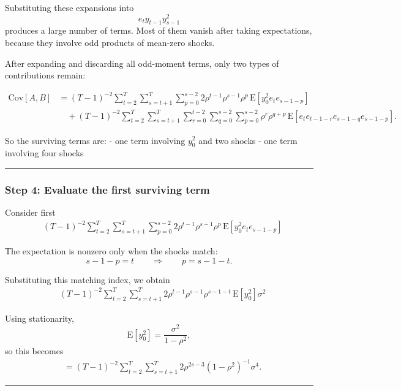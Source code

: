 \documentclass[11pt]{article}
\begin{document}
Substituting these expansions into \[
e_t y_{t-1} y_{s-1}^2
\] produces a large number of terms. Most of them vanish after taking
expectations, because they involve odd products of mean-zero shocks.

After expanding and discarding all odd-moment terms, only two types of
contributions remain:

\[
\begin{aligned}
\text{Cov}[A,B]
&=
(T-1)^{-2}\sum_{t=2}^{T}\sum_{s=t+1}^{T}\sum_{p=0}^{s-2}
2\rho^{t-1}\rho^{s-1}\rho^p\,\text{E}[y_0^2 e_t e_{s-1-p}]\\
&\quad+
(T-1)^{-2}\sum_{t=2}^{T}\sum_{s=t+1}^{T}\sum_{r=0}^{t-2}\sum_{q=0}^{s-2}\sum_{p=0}^{s-2}
\rho^r\rho^{q+p}\,\text{E}[e_t e_{t-1-r}e_{s-1-q}e_{s-1-p}].
\end{aligned}
\]

So the surviving terms are: - one term involving \(y_0^2\) and two
shocks - one term involving four shocks

\begin{center}\rule{0.5\linewidth}{0.5pt}\end{center}

\subsubsection{Step 4: Evaluate the first surviving
term}\label{step-4-evaluate-the-first-surviving-term}

Consider first \[
\begin{aligned}
&(T-1)^{-2}\sum_{t=2}^{T}\sum_{s=t+1}^{T}\sum_{p=0}^{s-2}
2\rho^{t-1}\rho^{s-1}\rho^p\,\text{E}[y_0^2 e_t e_{s-1-p}]
\end{aligned}
\]

The expectation is nonzero only when the shocks match: \[
s-1-p=t
\qquad\Longrightarrow\qquad
p=s-1-t.
\]

Substituting this matching index, we obtain \[
\begin{aligned}
&(T-1)^{-2}\sum_{t=2}^{T}\sum_{s=t+1}^{T}
2\rho^{t-1}\rho^{s-1}\rho^{s-1-t}\,\text{E}[y_0^2]\sigma^2
\end{aligned}
\]

Using stationarity, \[
\text{E}[y_0^2]=\frac{\sigma^2}{1-\rho^2},
\] so this becomes \[
\begin{aligned}
&=
(T-1)^{-2}\sum_{t=2}^{T}\sum_{s=t+1}^{T}
2\rho^{2s-3}(1-\rho^2)^{-1}\sigma^4.
\end{aligned}
\]

\begin{center}\rule{0.5\linewidth}{0.5pt}\end{center}
\end{document}
